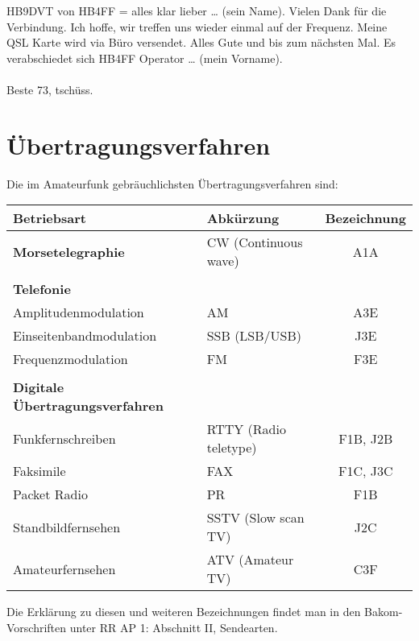 {
HB9DVT von HB4FF = alles klar lieber … (sein Name). Vielen Dank für die Verbindung. 
Ich hoffe, wir treffen uns wieder einmal auf der Frequenz. Meine QSL Karte wird via Büro versendet. 
Alles Gute und bis zum nächsten Mal. Es verabschiedet sich HB4FF Operator … (mein Vorname).\\
\\
Beste 73, tschüss.\\

}

\newpage
\section{Übertragungsverfahren}
Die im Amateurfunk gebräuchlichsten Übertragungsverfahren sind:

\vspace{1em}
\begin{tabular}{llc}
\bfseries Betriebsart & Abkürzung & Bezeichnung \\
\toprule

\bfseries Morsetelegraphie & CW (Continuous wave) & A1A \\ \\

\bfseries Telefonie &  &  \\
\midrule
Amplitudenmodulation & AM & A3E \\
Einseitenbandmodulation & SSB (LSB/USB) & J3E \\
Frequenzmodulation & FM & F3E \\ \\

\bfseries Digitale Übertragungsverfahren &  &  \\
\midrule
Funkfernschreiben & RTTY (Radio teletype) & F1B, J2B \\
Faksimile & FAX & F1C, J3C \\
Packet Radio & PR & F1B \\
Standbildfernsehen & SSTV (Slow scan TV) & J2C \\
Amateurfernsehen & ATV (Amateur TV) & C3F
\end{tabular}
\vspace{1em}

Die Erklärung zu diesen und weiteren Bezeichnungen findet man in den Bakom-Vorschriften unter RR AP 1: Abschnitt II, Sendearten.